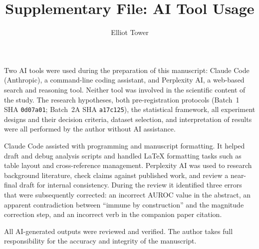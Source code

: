 \documentclass[11pt]{article}
\title{Supplementary File: AI Tool Usage}
\author{Elliot Tower}
\date{}
\begin{document}
\maketitle

Two AI tools were used during the preparation of this manuscript: Claude Code (Anthropic), a command-line coding assistant, and Perplexity AI, a web-based search and reasoning tool. Neither tool was involved in the scientific content of the study. The research hypotheses, both pre-registration protocols (Batch~1 SHA \texttt{0d07a01}; Batch~2A SHA \texttt{a17c125}), the statistical framework, all experiment designs and their decision criteria, dataset selection, and interpretation of results were all performed by the author without AI assistance.

Claude Code assisted with programming and manuscript formatting. It helped draft and debug analysis scripts and handled LaTeX formatting tasks such as table layout and cross-reference management.
Perplexity AI was used to research background literature, check claims against published work, and review a near-final draft for internal consistency. During the review it identified three errors that were subsequently corrected: an incorrect AUROC value in the abstract, an apparent contradiction between ``immune by construction'' and the magnitude correction step, and an incorrect verb in the companion paper citation.

All AI-generated outputs were reviewed and verified. The author takes full responsibility for the accuracy and integrity of the manuscript.
\end{document}
